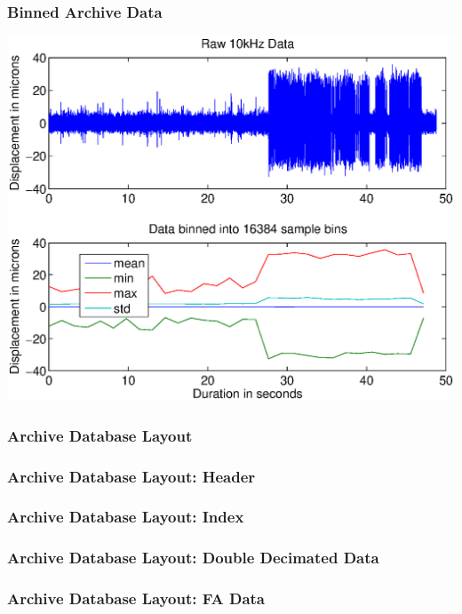 \documentclass{beamer}
\begin{document}
\begin{frame}\frametitle{Binned Archive Data}
\begin{center}
\includegraphics[width=.9\linewidth]{binning}
\end{center}
\end{frame}


\begin{frame}\frametitle{Archive Database Layout}

\end{frame}


\begin{frame}\frametitle{Archive Database Layout: Header}

\end{frame}


\begin{frame}\frametitle{Archive Database Layout: Index}

\end{frame}


\begin{frame}\frametitle{Archive Database Layout: Double Decimated Data}

\end{frame}


\begin{frame}\frametitle{Archive Database Layout: FA Data}

\end{frame}
\end{document}
